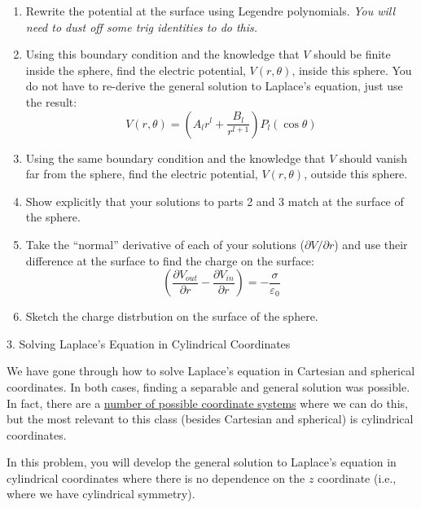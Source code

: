 \documentclass[11pt]{article}
\def\tightlist{}
\begin{document}
\begin{enumerate}
\def\labelenumi{\arabic{enumi}.}
\tightlist
\item
  Rewrite the potential at the surface using Legendre polynomials.
  \emph{You will need to dust off some trig identities to do this.}
\item
  Using this boundary condition and the knowledge that \(V\) should be
  finite inside the sphere, find the electric potential,
  \(V(r,\theta)\), inside this sphere. You do not have to re-derive the
  general solution to Laplace's equation, just use the result:
  \[V(r,\theta) = \left(A_lr^l+\dfrac{B_l}{r^{l+1}}\right)P_l(\cos \theta)\]
\item
  Using the same boundary condition and the knowledge that \(V\) should
  vanish far from the sphere, find the electric potential,
  \(V(r,\theta)\), outside this sphere.
\item
  Show explicitly that your solutions to parts 2 and 3 match at the
  surface of the sphere.
\item
  Take the ``normal'' derivative of each of your solutions
  (\(\partial V/\partial r\)) and use their difference at the surface to
  find the charge on the surface:
  \[\left(\dfrac{\partial V_{out}}{\partial r}-\dfrac{\partial V_{in}}{\partial r}\right) = -\dfrac{\sigma}{\varepsilon_0}\]
\item
  Sketch the charge distrbution on the surface of the sphere.
\end{enumerate}

{\Large 3. Solving Laplace's Equation in Cylindrical
Coordinates}\label{solving-laplaces-equation-in-cylindrical-coordinates}

We have gone through how to solve Laplace's equation in Cartesian and
spherical coordinates. In both cases, finding a separable and general
solution was possible. In fact, there are a
\href{http://mathworld.wolfram.com/LaplacesEquation.html}{number of
possible coordinate systems} where we can do this, but the most relevant
to this class (besides Cartesian and spherical) is cylindrical
coordinates.

In this problem, you will develop the general solution to Laplace's
equation in cylindrical coordinates where there is no dependence on the
\(z\) coordinate (i.e., where we have cylindrical symmetry).
\end{document}
